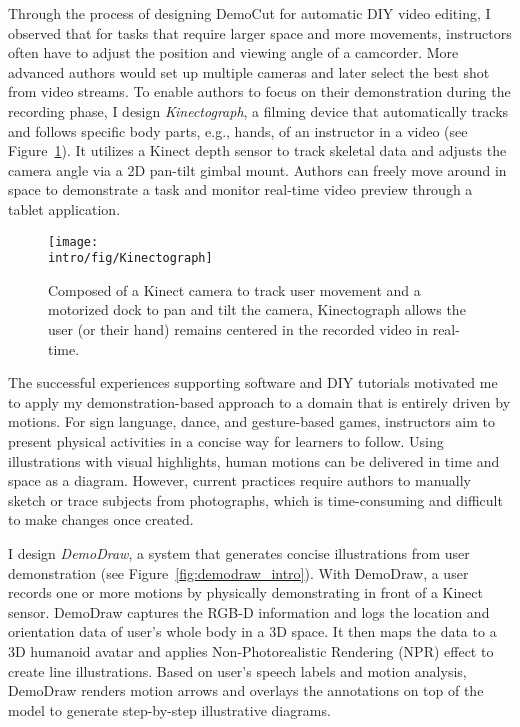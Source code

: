 Through the process of designing DemoCut for automatic DIY video editing, I observed that for tasks that require larger space and more movements, instructors often have to adjust the position and viewing angle of a camcorder. More advanced authors would set up multiple cameras and later select the best shot from video streams.
%
To enable authors to focus on their demonstration during the recording phase, I design \emph{Kinectograph}, a filming device that automatically tracks and follows specific body parts, e.g., hands, of an instructor in a video (see Figure~\ref{fig:kinectograph_intro}). It utilizes a Kinect depth sensor to track skeletal data and adjusts the camera angle via a 2D pan-tilt gimbal mount. Authors can freely move around in space to demonstrate a task and monitor real-time video preview through a tablet application.

\begin{figure}[!t]
  \centering
  \texttt{[image: \\intro/fig/Kinectograph]}
  \caption{Composed of a Kinect camera to track user movement and a motorized dock to pan and tilt the camera, Kinectograph allows the user (or their hand) remains centered in the recorded video in real-time.}
\label{fig:kinectograph_intro}
\end{figure}


The successful experiences supporting software and DIY tutorials motivated me to apply my demonstration-based approach to a domain that is entirely driven by motions. For sign language, dance, and gesture-based games, instructors aim to present physical activities in a concise way for learners to follow. Using illustrations with visual highlights, human motions can be delivered in time and space as a diagram. However, current practices require authors to manually sketch or trace subjects from photographs, which is time-consuming and difficult to make changes once created.

I design \emph{DemoDraw}, a system that generates concise illustrations from user demonstration (see Figure~\ref{fig:demodraw_intro}). With DemoDraw, a user records one or more motions by physically demonstrating in front of a Kinect sensor. DemoDraw captures the RGB-D information and logs the location and orientation data of user's whole body in a 3D space. It then maps the data to a 3D humanoid avatar and applies Non-Photorealistic Rendering (NPR) effect to create line illustrations. Based on user's speech labels and motion analysis, DemoDraw renders motion arrows and overlays the annotations on top of the model to generate step-by-step illustrative diagrams.

